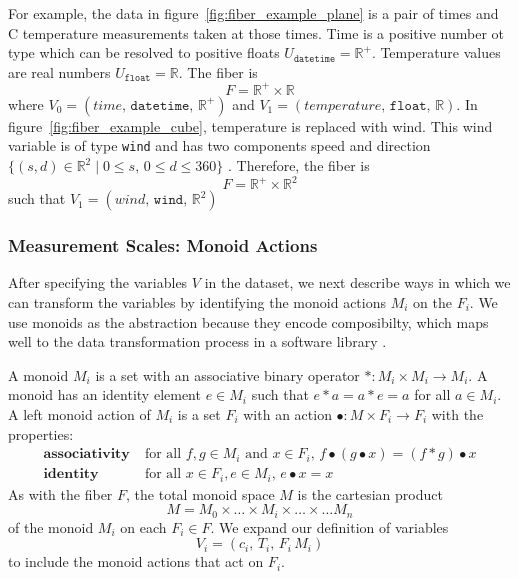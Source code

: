 \documentclass[../main.tex]{subfiles}
\begin{document}
For example, the data in figure~\ref{fig:fiber_example_plane} is a pair of times and \textdegree C temperature measurements taken at those times. Time is a positive number ot type  which can be resolved to positive floats $U_{\texttt{datetime}}= \mathbb{R}^+$. Temperature values are real numbers $U_{\texttt{float}} = \mathbb{R}$. The fiber is 
\begin{equation}
    F =  \mathbb{R}^{+} \times \mathbb{R} 
\end{equation} 
where $V_0 = (time,\, \texttt{datetime},\, \mathbb{R}^+)$ and $V_1 = (temperature,\, \texttt{float},\, \mathbb{R})$. In figure~\ref{fig:fiber_example_cube}, temperature is replaced with wind. This wind variable is of type \texttt{wind} and has two components speed and direction $\{(s,d) \in \mathbb{R}^{2} \mid  0\leq s,\, 0 \leq d \leq 360\}$ . Therefore, the fiber is 
\begin{equation}
    F = \mathbb{R}^{+} \times \mathbb{R}^2
\end{equation} 
such that $V_1 = (wind,\, \texttt{wind},\, \mathbb{R}^{2})$  

\subsubsection{Measurement Scales: Monoid Actions}
\label{sec:data_monoid}
After specifying the variables $V$ in the dataset, we next describe ways in which we can transform the variables by identifying the monoid actions $M_i$ on the $F_i$. We use monoids as the abstraction because they encode composibilty, which maps well to the data transformation process in a software library \cite{yorgeyMonoidsThemeVariations}. 

A monoid \cite{Monoid2021} $M_i$ is a set with an associative binary operator $\ast:M_i \times M_i\rightarrow M_i$. A monoid has an identity element $e\in M_i$ such that $e\ast a= a \ast e = a$ for all $a \in M_i$. A left monoid action \cite{SemigroupAction2021,ActionNLab} of $M_i$ is a set $F_i$ with an action $\bullet: M\times F_i \rightarrow F_i$ with the properties:
\begin{align*}
    \textbf{associativity}\;& \text{for all } f,g \in M_i \text{ and } x\in F_i,\, f\bullet(g\bullet x) = (f\ast g) \bullet x\\
    \textbf{identity}\;& \text{for all } x\in F_i, e\in M_i,\,  e\bullet x = x 
\end{align*}
As with the fiber $F$, the total monoid space $M$ is the cartesian product
\begin{equation}
M = M_{0} \times \ldots \times M_{i}\times \ldots \times\ldots M_{n}
\end{equation}
of the monoid $M_{i}$ on each $F_{i}\in F$. We expand our definition of variables 
\begin{equation}
        V_i = (c_i,\, T_i,\, F_i\, M_i)
\end{equation}
to include the monoid actions that act on $F_i$. 
\end{document}
